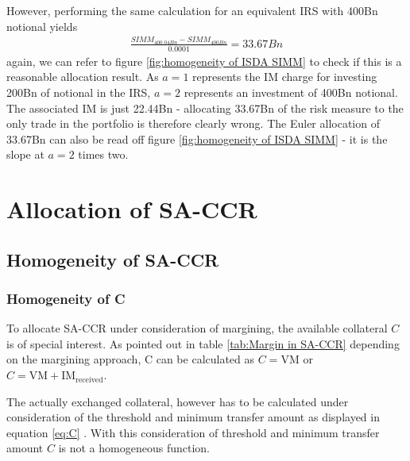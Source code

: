 \documentclass[../Thesis_AHoecherl.tex]{subfiles}
\begin{document}
    However, performing the same calculation for an equivalent IRS with 400Bn notional yields
    \begin{align*}
        \frac{SIMM_{400.04Bn} - SIMM_{400Bn}}{0.0001} = 33.67Bn
    \end{align*}
    again, we can refer to figure \ref{fig:homogeneity of ISDA SIMM} to check if this is a reasonable allocation result. As $a=1$ represents the IM charge for investing 200Bn of notional in the IRS, $a=2$ represents an investment of 400Bn notional. The associated IM is just 22.44Bn - allocating 33.67Bn of the risk measure to the only trade in the portfolio is therefore clearly wrong. The Euler allocation of 33.67Bn can also be read off figure \ref{fig:homogeneity of ISDA SIMM} - it is the slope at $a=2$ times two.

    



    \section{Allocation of SA-CCR}\label{Allocation of SA-CCR}

    \subsection{Homogeneity of SA-CCR}

    \subsubsection{Homogeneity of C}

    To allocate \gls{SA-CCR} under consideration of margining, the available collateral $C$ is of special interest. As pointed out in table \ref{tab:Margin in SA-CCR} depending on the margining approach, C can be calculated as $C = \text{VM}$ or $C = \text{VM} + \text{IM}_{\text{received}}$.

    The actually exchanged collateral, however has to be calculated under consideration of the threshold and minimum transfer amount as displayed in equation \ref{eq:C} . With this consideration of threshold and minimum transfer amount $C$ is not a homogeneous function. 
\end{document}
